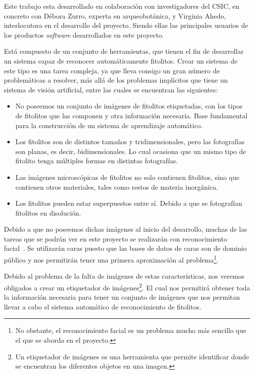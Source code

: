 
Este trabajo esta desarrollado en colaboración con investigadores del CSIC, en concreto con Débora Zurro, experta en arqueobotánica, y Virginia Ahedo, interlocutora en el desarrollo del proyecto. Siendo ellas las principales usuarios de los productos \textit{software} desarrollados en este proyecto. 

Está compuesto de un conjunto de herramientas, que tienen el fin de desarrollar un sistema capaz de reconocer automáticamente fitolitos. Crear un sistema de este tipo es una tarea compleja, ya que lleva consigo un gran número de problemáticas a resolver, más allá de los problemas implícitos que tiene un sistema de visión artificial, entre las cuales se encuentran las siguientes:

\begin{itemize}
	\item No poseemos un conjunto de imágenes de fitolitos etiquetadas, con los tipos de fitolitos que las componen y otra información necesaria. Base fundamental para la construcción de un sistema de aprendizaje automático.
	\item Los fitolitos son de distintos tamaños y tridimensionales, pero las fotografías son planas, es decir, bidimensionales. Lo cual ocasiona que un mismo tipo de fitolito tenga múltiples formas en distintas fotografías.
	\item Las imágenes microscópicas de fitolitos no solo contienen fitolitos, sino que contienen otros materiales, tales como restos de materia inorgánica.
	\item Los fitolitos pueden estar superpuestos entre sí. Debido a que se fotografían fitolitos en disolución.
\end{itemize}

Debido a que no poseemos dichas imágenes al inicio del desarrollo, muchas de las tareas que se podrán ver en este proyecto se realizarán con reconocimiento facial~\cite{facedetection}. Se utilizarán caras puesto que las bases de datos de caras son de dominio público y nos permitirán tener una primera aproximación al problema\footnote{No obstante, el reconocimiento facial es un problema mucho más sencillo que el que se aborda en el proyecto.}.

Debido al problema de la falta de imágenes de estas características, nos veremos obligados a crear un etiquetador de imágenes\footnote{Un etiquetador de imágenes es una herramienta que permite identificar donde se encuentran los diferentes objetos en una imagen.}. El cual nos permitirá obtener toda la información necesaria para tener un conjunto de imágenes que nos permitan llevar a cabo el sistema automático de reconocimiento de fitolitos.


